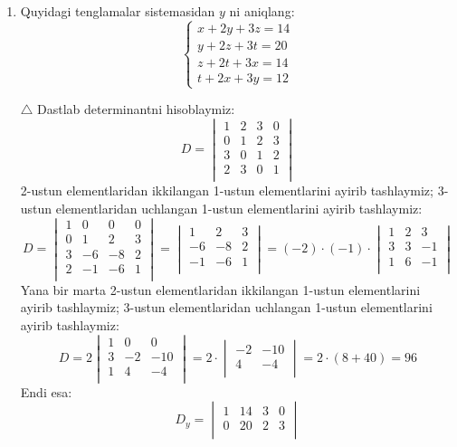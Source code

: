 \begin{enumerate}
\item Quyidagi tenglamalar sistemasidan $y$ ni aniqlang:
$$\begin{cases}
	x+2y+3z=14\\
	y+2z+3t=20\\
	z+2t+3x=14\\
	t+2x+3y=12
\end{cases}
	$$
	
	$\triangle$ Dastlab determinantni hisoblaymiz:
	$$D=\begin{vmatrix}
		1&2&3&0\\
		0&1&2&3\\
		3&0&1&2\\
		2&3&0&1\\
	\end{vmatrix}$$
2-ustun elementlaridan ikkilangan 1-ustun elementlarini ayirib tashlaymiz; 3-ustun elementlaridan uchlangan 1-ustun elementlarini ayirib tashlaymiz:
$$D=\begin{vmatrix}
	1&0&0&0\\
	0&1&2&3\\
	3&-6&-8&2\\
	2&-1&-6&1\\
\end{vmatrix}=\begin{vmatrix}
1&2&3\\
-6&-8&2\\
-1&-6&1\\
\end{vmatrix}=(-2)\cdot(-1)\cdot\begin{vmatrix}
1&2&3\\
3&3&-1\\
1&6&-1\\
\end{vmatrix}$$
Yana bir  marta 2-ustun elementlaridan ikkilangan 1-ustun elementlarini ayirib tashlaymiz; 3-ustun elementlaridan uchlangan 1-ustun elementlarini ayirib tashlaymiz:
$$D=2\begin{vmatrix}
	1&0&0\\
	3&-2&-10\\
	1&4&-4\\
\end{vmatrix}=2\cdot\begin{vmatrix}
-2&-10\\
4&-4\\
\end{vmatrix}=2\cdot(8+40)=96$$
Endi esa:
$$D_{y}=\begin{vmatrix}
	1&14&3&0\\
	0&20&2&3\\

\end{vmatrix}$$
\end{enumerate}
